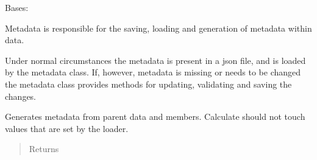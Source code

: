 \documentclass[letterpaper,10pt,english]{sphinxmanual}
\begin{document}
\begin{fulllineitems}
\label{\detokenize{autodocs/data:listmode.data.Metadata}}
\sphinxAtStartPar
Bases: 

\sphinxAtStartPar
Metadata is responsible for the saving, loading and generation of metadata within data.

\sphinxAtStartPar
Under normal circumstances the metadata is present in a json file, and is loaded by the metadata class. If,
however, metadata is missing or needs to be changed the metadata class provides methods for updating, validating
and saving the changes.

\begin{fulllineitems}
\label{\detokenize{autodocs/data:listmode.data.Metadata.calculate}}
\sphinxAtStartPar
Generates metadata from parent data and members. Calculate should not touch values that are set by the loader.
\begin{quote}\begin{description}
\item[{Returns}] \leavevmode
\sphinxAtStartPar


\end{description}\end{quote}

\end{fulllineitems}


\begin{fulllineitems}
\label{\detokenize{autodocs/data:listmode.data.Metadata.counts}}
\end{fulllineitems}


\begin{fulllineitems}
\label{\detokenize{autodocs/data:listmode.data.Metadata.events}}
\end{fulllineitems}


\end{fulllineitems}
\end{document}
